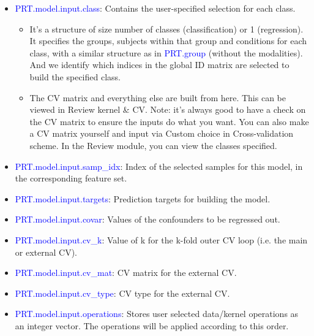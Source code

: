 \begin{itemize}

\item \textcolor{blue}{PRT.model.input.class}: Contains the user-specified selection for each class. 

\begin{itemize}
\item It's a structure of size number of classes (classification) or 1 (regression). It specifies the groups, subjects within that group and conditions for each class, with a similar structure as in \textcolor{blue}{PRT.group} (without the modalities). And we identify which indices in the global ID matrix are selected to build the specified class.
\item The CV matrix and everything else are built from here. This can be viewed in Review kernel \& CV. Note: it’s always good to have a check on the CV matrix to ensure the inputs do what you want. You can also make a CV matrix yourself and input via Custom choice in Cross-validation scheme. In the Review module, you can view the classes specified.
\end{itemize}


\item \textcolor{blue}{PRT.model.input.samp\_idx}: Index of the selected samples for this model, in the corresponding feature set.



\item \textcolor{blue}{PRT.model.input.targets}: Prediction targets for building the model.


\item \textcolor{blue}{PRT.model.input.covar}: Values of the confounders to be regressed out.


\item \textcolor{blue}{PRT.model.input.cv\_k}: Value of k for the k-fold outer CV loop (i.e. the main or external CV).

\item \textcolor{blue}{PRT.model.input.cv\_mat}: CV matrix for the external CV.

\item \textcolor{blue}{PRT.model.input.cv\_type}: CV type for the external CV.

\item \textcolor{blue}{PRT.model.input.operations}: Stores user selected data/kernel operations as an integer vector. The operations will be applied according to this order. 
 
\end{itemize} 

